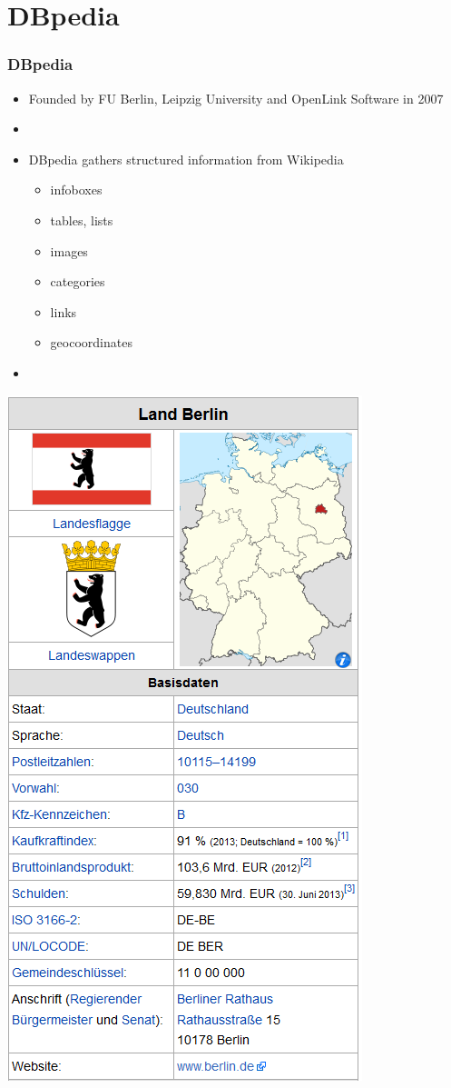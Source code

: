 \section{DBpedia}

\begin{frame}
\frametitle{DBpedia}


\begin{minipage}{0.7\textwidth}
\begin{itemize}
  \item Founded by FU Berlin, Leipzig University and OpenLink Software in 2007
  \item[]
  \item DBpedia gathers structured information from Wikipedia
	\begin{itemize}
	  \item infoboxes
	  \item tables, lists
	  \item images
	  \item categories
	  \item links
	  \item geocoordinates
	\end{itemize}
	\item[]
\end{itemize}
\end{minipage}
\hfill %
\begin{minipage}{0.25\textwidth}
\includegraphics[scale=0.25]{img/berlin_infobox.png}

\end{minipage}
\end{frame}

